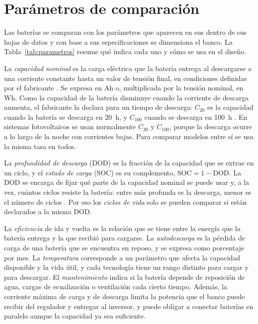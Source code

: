 \section{Parámetros de comparación}\label{sec:parametros}

Las baterías se comparan con los parámetros que aparecen en sus dentro de sus hojas de datos y con base a sus especificaciones se dimensiona el banco. La Tabla~\ref{tab:parametros} resume qué indica cada uno y cómo se usa en el diseño.

La \emph{capacidad nominal} es la carga eléctrica que la batería entrega al descargarse a una corriente constante hasta un valor de  tensión final, en condiciones definidas por el fabricante \cite{linden}. Se expresa en Ah o, multiplicada por la tensión nominal, en Wh. Como la capacidad de la batería disminuye cuando la corriente de descarga aumenta, el fabricante la declara para un tiempo de descarga: $C_{20}$ es la capacidad cuando la batería se descarga en \SI{20}{h}, y $C_{100}$ cuando se descarga en \SI{100}{h} \cite{linden}. En sistemas fotovoltaicos se usan normalmente $C_{20}$ y $C_{100}$, porque la descarga ocurre a lo largo de la noche con corrientes bajas. Para comparar modelos entre sí se usa la misma tasa en todos.

La \emph{profundidad de descarga} (DOD) es la fracción de la capacidad que se extrae en un ciclo, y el \emph{estado de carga} (SOC) es su complemento, $\mathrm{SOC} = 1 - \mathrm{DOD}$. La DOD se encarga de fijar qué parte de la capacidad nominal se puede usar y, a la vez, cuántos ciclos resiste la batería: entre más profunda es la descarga, menor es el número de ciclos \cite{linden}. Por eso los \emph{ciclos de vida} solo se pueden comparar si están declarados a la misma DOD.

La \emph{eficiencia} de ida y vuelta es la relación que se tiene entre la energía que la batería entrega y la que recibió para cargarse. La \emph{autodescarga} es la pérdida de carga de una batería que se encuentra en reposo, y se expresa como porcentaje por mes. La \emph{temperatura} corresponde a un parámetro que afecta la capacidad disponible y la vida útil, y cada tecnología tiene un rango distinto para cargar y para descargar. El \emph{mantenimiento} indica si la batería depende de reposición de agua, cargas de ecualización o ventilación cada cierto tiempo. Además, la corriente máxima de carga y de descarga limita la potencia que el banco puede recibir del regulador y entregar al inversor, y puede obligar a conectar baterías en paralelo aunque la capacidad ya sea suficiente.

